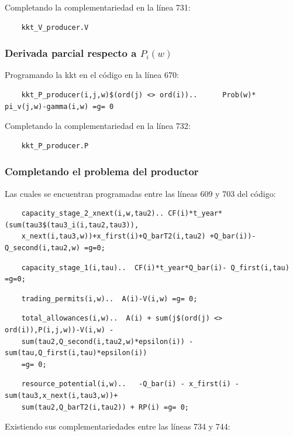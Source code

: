 Completando la complementariedad en la línea 731:
\begin{verbatim}
    kkt_V_producer.V
\end{verbatim}

\subsubsection{Derivada parcial respecto a $P_i(w)$}

Programando la kkt en el código en la línea 670:
\begin{verbatim}
    kkt_P_producer(i,j,w)$(ord(j) <> ord(i))..      Prob(w)* pi_v(j,w)-gamma(i,w) =g= 0
\end{verbatim}

Completando la complementariedad en la línea 732:
\begin{verbatim}
    kkt_P_producer.P  
\end{verbatim}

\subsubsection{Completando el problema del productor}

Las cuales se encuentran programadas entre las líneas 609 y 703 del código:

\begin{verbatim}
    capacity_stage_2_xnext(i,w,tau2).. CF(i)*t_year*(sum(tau3$(tau3_i(i,tau2,tau3)),
    x_next(i,tau3,w))+x_first(i)+Q_barT2(i,tau2) +Q_bar(i))-Q_second(i,tau2,w) =g=0;
\end{verbatim}
\begin{verbatim}
    capacity_stage_1(i,tau)..  CF(i)*t_year*Q_bar(i)- Q_first(i,tau) =g=0;
\end{verbatim}
\begin{verbatim}
    trading_permits(i,w)..  A(i)-V(i,w) =g= 0;
\end{verbatim}
\begin{verbatim}
    total_allowances(i,w)..  A(i) + sum(j$(ord(j) <> ord(i)),P(i,j,w))-V(i,w) - 
    sum(tau2,Q_second(i,tau2,w)*epsilon(i)) - sum(tau,Q_first(i,tau)*epsilon(i))   
    =g= 0;
\end{verbatim}
\begin{verbatim}
    resource_potential(i,w)..   -Q_bar(i) - x_first(i) - sum(tau3,x_next(i,tau3,w))+
    sum(tau2,Q_barT2(i,tau2)) + RP(i) =g= 0;
\end{verbatim}

Existiendo sus complementariedades entre las líneas 734 y 744:

